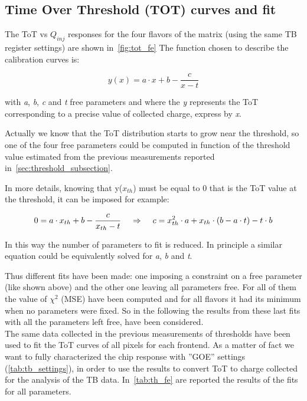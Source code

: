 \subsection{Time Over Threshold (TOT) curves and fit} \label{sec:tot_fit}

The ToT vs $Q_{inj}$ responses for the four flavors of the matrix (using the same TB register settings) are shown in~\autoref{fig:tot_fe}
The function chosen to describe the calibration curves is:

\begin{equation}
y(x) = a\cdot x +b -\frac{c}{x-t}
\label{eq:fit_function}
\end{equation}

with \textit{a}, \textit{b}, \textit{c} and \textit{t} free parameters and where the \textit{y} represents the ToT corresponding to a precise value of collected charge, express by \textit{x}. 

Actually we know that the ToT distribution starts to grow near the threshold, so one of the four free parameters could be computed in function of the threshold value estimated from the previous measurements reported in~\autoref{sec:threshold_subsection}.

In more details, knowing that y($x_{th}$) must be equal to 0 that is the ToT value at the threshold, it can be imposed for example:

\begin{equation}
0 = a\cdot x_{th} + b - \frac{c}{x_{th}-t}  \hspace{.4cm}	\Rightarrow  \hspace{.4cm}	c = x_{th}^{2}\cdot a + x_{th}\cdot (b-a\cdot t) - t\cdot b
\end{equation}

In this way the number of parameters to fit is reduced. In principle a similar equation could be equivalently solved for \textit{a}, \textit{b} and \textit{t}. 


Thus different fits have been made: one imposing a constraint on a free parameter (like shown above) and the other one leaving all parameters free. For all of them the value of $\chi^{2}$ (MSE) have been computed and for all flavors it had its minimum when no parameters were fixed. So in the following the results from these last fits with all the parameters left free, have been considered.\\

The same data collected in the previous measurements of thresholds have been used to fit the ToT curves of all pixels for each frontend. As a matter of fact we want to fully characterized the chip response with ''GOE'' settings (\autoref{tab:tb_settings}), in order to use the results to convert ToT to charge collected for the analysis of the TB data.
In~\autoref{tab:th_fe} are reported the results of the fits for all parameters.

